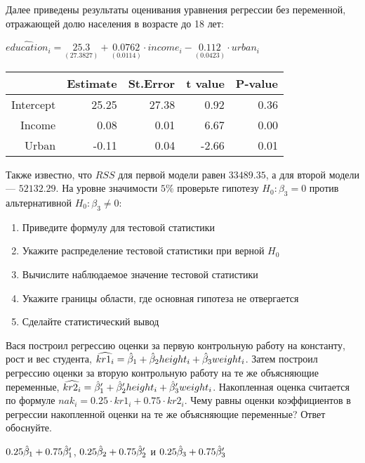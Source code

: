 \documentclass[pdftex,11pt,openany]{book}\usepackage[]{graphicx}\usepackage[]{color}
\begin{document}
\begin{problem}
\begin{enumerate}
Далее приведены результаты оценивания уравнения регрессии без переменной, отражающей долю населения в возрасте до 18 лет:
\begin{center}
\ensuremath{\widehat{education}_i=\underset{(27.3827)}{25.3}+\underset{( 0.0114)}{0.0762}\cdot income_i-\underset{( 0.0423)}{0.112}\cdot urban_i}%
\begin{table}[ht]
\centering
\begin{tabular}{rrrrr}
  \hline
 & Estimate & St.Error & t value & P-value \\ 
  \hline
Intercept & 25.25 & 27.38 & 0.92 & 0.36 \\ 
  Income & 0.08 & 0.01 & 6.67 & 0.00 \\ 
  Urban & -0.11 & 0.04 & -2.66 & 0.01 \\ 
   \hline
\end{tabular}
\end{table}

\end{center}
Также известно, что $RSS$ для первой модели равен $33489.35$, а для второй модели --- $52132.29$. На уровне значимости $5\%$ проверьте гипотезу $H_0: \beta_3 = 0$ против альтернативной $H_0: \beta_3 \not= 0$:
\begin{enumerate}
\item Приведите формулу для тестовой статистики
\item Укажите распределение тестовой статистики при верной $H_0$
\item Вычислите наблюдаемое значение тестовой статистики
\item Укажите границы области, где основная гипотеза не отвергается
\item Сделайте статистический вывод
\end{enumerate}
\end{enumerate}
\end{problem}

\begin{solution}
\end{solution}



\begin{problem}
 Вася построил регрессию оценки за первую контрольную работу на константу, рост и вес студента, $\widehat{kr1_i}=\hat{\beta}_1 + \hat{\beta}_2 height_i + \hat{\beta}_3 weight_i$. Затем построил регрессию оценки за вторую контрольную работу на те же объясняющие переменные, $\widehat{kr2_i}=\hat{\beta}_1' + \hat{\beta}_2' height_i + \hat{\beta}_3' weight_i$. Накопленная оценка считается по формуле $nak_i=0.25 \cdot kr1_i + 0.75 \cdot kr2_i$. Чему равны оценки коэффициентов в регрессии накопленной оценки на те же объясняющие переменные? Ответ обоснуйте.
\end{problem}
\begin{solution}
$0.25\hat{\beta}_1+0.75\hat{\beta}_1'$, $0.25\hat{\beta}_2+0.75\hat{\beta}_2'$ и $0.25\hat{\beta}_3+0.75\hat{\beta}_3'$
\end{solution}
\end{document}
